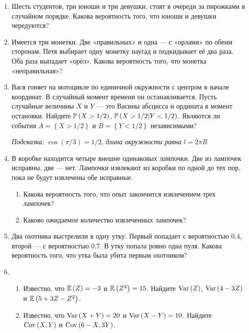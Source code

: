 \begin{enumerate}
\item Шесть студентов, три юноши и три девушки, стоят в очереди за пирожками в
случайном порядке. Какова вероятность того, что юноши и девушки чередуются?

\item Имеется три монетки. Две «правильных» и одна — с «орлами» по обеим сторонам.
Петя выбирает одну монетку наугад и подкидывает её два раза. Оба раза выпадает «орёл».
Какова вероятность того, что монетка «неправильная»?

\item Вася гоняет на мотоцикле по единичной окружности с центром в начале координат.
В случайный момент времени он останавливается. Пусть случайные величины $X$ и $Y$
— это Васины абсцисса и ордината в момент остановки. Найдите  $\P\left(X > 1/2
\right)$,  $\P\left(X > 1/2 |Y < 1/2 \right)$. Являются ли события
$A=\left\{X > 1/2 \right\}$ и $B=\left\{Y < 1/2 \right\}$ независимыми?

{\it Подсказка: } $\cos(\pi / 3 ) = 1/2$, {\it длина окружности равна} $l = 2 \pi R$

\item В коробке находится четыре внешне одинаковых лампочки. Две из лампочек исправны,
две — нет. Лампочки извлекают из коробки по одной до тех пор, пока не будут извлечены
обе исправные.
\begin{enumerate}
\item	Какова вероятность того, что опыт закончится извлечением трех лампочек?
\item Каково ожидаемое количество извлеченных лампочек?
\end{enumerate}

\item Два охотника выстрелили в одну утку. Первый попадает с вероятностью $0.4$,
второй — с вероятностью $0.7$. В утку попала ровно одна пуля. Какова вероятность
того, что утка была убита первым охотником?

\item
\begin{enumerate}
\item Известно, что $\E\left(Z\right) = -3$ и $\E\left(Z^{2} \right) = 15$.
Найдите  $\Var\left(Z\right)$, $\Var\left(4 - 3Z \right)$ и $\E\left(5 + 3Z - Z^{2} \right)$.
\item Известно, что $\Var\left(X + Y \right) = 20$ и $\Var\left(X - Y\right) = 10$.
Найдите $\Cov\left(X, Y \right)$ и $\Cov\left(6 - X, 3Y \right)$.
\end{enumerate}


\end{enumerate}
